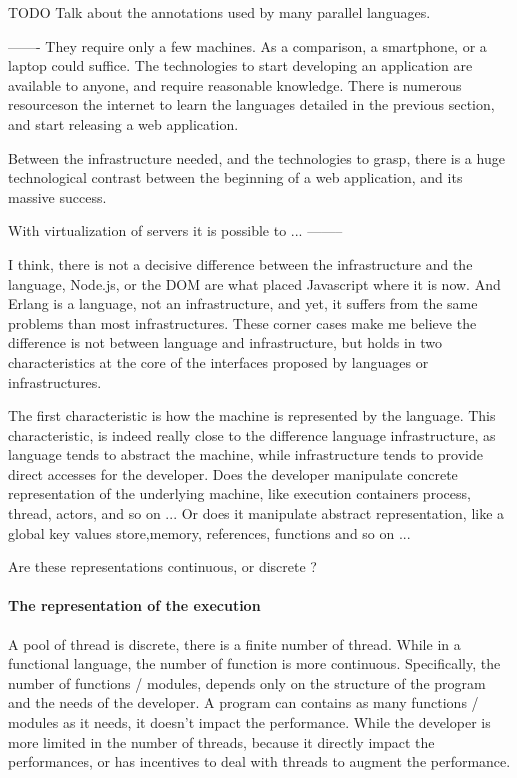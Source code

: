 TODO Talk about the annotations used by many parallel languages.





-------
They require only a few machines.
As a comparison, a smartphone, or a laptop could suffice.
The technologies to start developing an application are available to anyone, and require reasonable knowledge.
There is numerous resourceson the internet to learn the languages detailed in the previous section, and start releasing a web application.

Between the infrastructure needed, and the technologies to grasp, there is a huge technological contrast between the beginning of a web application, and its massive success.

With virtualization of servers it is possible to ...
--------










I think, there is not a decisive difference between the infrastructure and the language, Node.js, or the DOM are what placed Javascript where it is now.
And Erlang is a language, not an infrastructure, and yet, it suffers from the same problems than most infrastructures.
These corner cases make me believe the difference is not between language and infrastructure, but holds in two characteristics at the core of the interfaces proposed by languages or infrastructures.

The first characteristic is how the machine is represented by the language.
This characteristic, is indeed really close to the difference language infrastructure, as language tends to abstract the machine, while infrastructure tends to provide direct accesses for the developer.
Does the developer manipulate concrete representation of the underlying machine, like execution containers process, thread, actors, and so on ...
Or does it manipulate abstract representation, like a global key values store,memory, references, functions and so on ...

Are these representations continuous, or discrete ?

\paragraph{The representation of the execution}
A pool of thread is discrete, there is a finite number of thread.
While in a functional language, the number of function is more continuous.
Specifically, the number of functions / modules, depends only on the structure of the program and the needs of the developer.
A program can contains as many functions / modules as it needs, it doesn't impact the performance.
While the developer is more limited in the number of threads, because it directly impact the performances, or has incentives to deal with threads to augment the performance.

